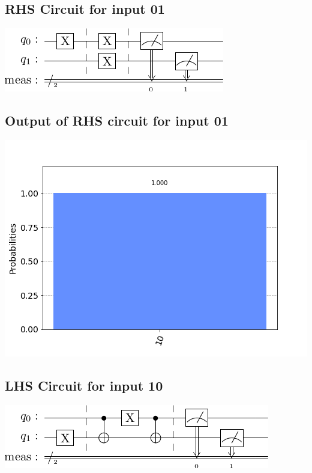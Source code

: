 \documentclass[a4paper]{article}
\begin{document}
\begin{answer}[Question 1 b (a)]
        \subsection*{RHS Circuit for input 01}
        \includegraphics[scale=0.5]{a201.png}
        \subsection*{Output of RHS circuit for input 01}
        \includegraphics[scale = 0.5]{a201-out.png}
        \subsection*{LHS Circuit for input 10}
        \includegraphics[scale=0.5]{a110.png}

\end{answer}
\end{document}
